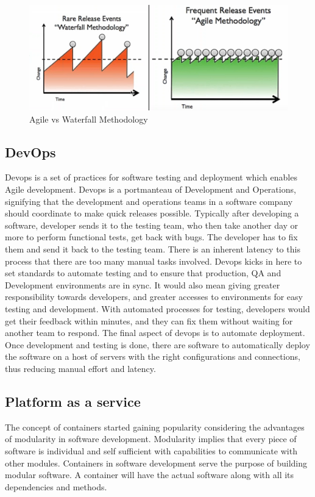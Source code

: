 \documentclass[9pt,twocolumn,twoside]{../../styles/osajnl}
\begin{document}
\begin{figure}[htbp]
\centering
\includegraphics[width=\linewidth]{images/agile.png}
\caption{Agile vs Waterfall Methodology \cite{www-youtube-cf}}
\label{fig:agile}
\end{figure}

\subsection{DevOps}
Devops is a set of practices for software testing and deployment which enables Agile development. Devops is a portmanteau of Development and Operations, signifying that the development and operations teams in a software company should coordinate to make quick releases possible. Typically after developing a software, developer sends it to the testing team, who then take another day or more to perform functional tests, get back with bugs. The developer has to fix them and send it back to the testing team. There is an inherent latency to this process that there are too many manual tasks involved. Devops kicks in here to set standards to automate testing and to ensure that production, QA and Development environments are in sync. It would also mean giving greater responsibility towards developers, and greater accesses to environments for easy testing and development. With automated processes for testing, developers would get their feedback within minutes, and they can fix them without waiting for another team to respond. The final aspect of devops is to automate deployment. Once development and testing is done, there are software to automatically deploy the software on a host of servers with the right configurations and connections, thus reducing manual effort and latency. 

\subsection{Platform as a service}
The concept of containers started gaining popularity considering the advantages of modularity in software development. Modularity implies that every piece of software is individual and self sufficient with capabilities to communicate with other modules. Containers in software development serve the purpose of building modular software. A container will have the actual software along with all its dependencies and methods. 
\end{document}
